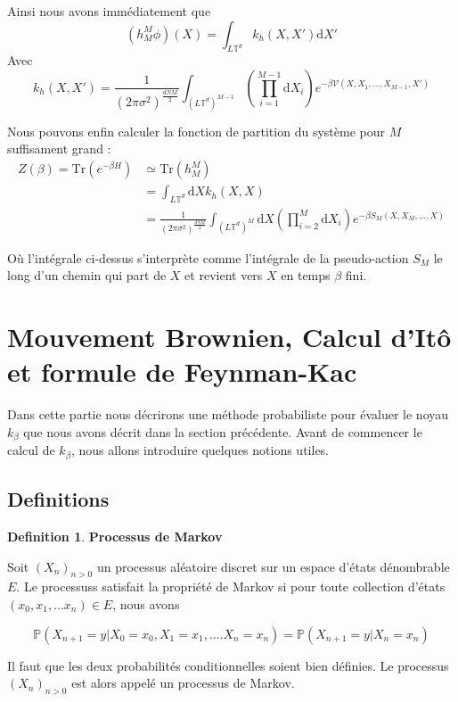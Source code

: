 \documentclass[11pt]{article}
\theoremstyle{definition}
\newtheorem{definition}{Definition}[section]
\theoremstyle{remark}
\newcommand{\dom}{L\mathbb{T}^d}
\begin{document}
Ainsi nous avons immédiatement que 
\begin{equation}
(h_M^M\phi)(X)=\int_{\dom}k_h(X,X')\mathrm{d}X'
\end{equation}
Avec 
\begin{equation}
k_h(X,X')=\frac{1}{(2\pi\sigma^2)^\frac{dNM}{2}}\int_{(\dom)^{M-1}} \left(\prod_{i=1}^{M-1}\mathrm{d}X_i\right) e^{-\beta \mathcal{V}(X,X_1,\ldots,X_{M-1},X')}
\end{equation}

Nous pouvons enfin calculer la fonction de partition du système pour $M$ suffisament grand :
\begin{align*}
Z(\beta)=\mathrm{Tr}(e^{-\beta H})& \simeq \mathrm{Tr}(h_M^M)
\\
&= \int_{\dom}\mathrm{d}X k_h(X,X)
\\
&= \frac{1}{(2\pi\sigma^2)^\frac{dNM}{2}}\int_{(\dom)^{M}} \mathrm{d}X\left(\prod_{i=2}^{M}\mathrm{d}X_i\right) e^{-\beta S_M(X,X_M,\ldots,X)}
\end{align*}

Où l'intégrale ci-dessus s'interprète comme l'intégrale de la pseudo-action $S_M$ le long d'un chemin qui part de $X$ et revient vers $X$ en temps $\beta$ fini.

\section{Mouvement Brownien, Calcul d'Itô et formule de Feynman-Kac}
Dans cette partie nous décrirons une méthode probabiliste pour évaluer le noyau $k_{\beta}$ que nous avons décrit dans la section précédente. 
Avant de commencer le calcul de $k_{\beta}$, nous allons introduire quelques notions utiles.

\subsection{Definitions}

\theoremstyle{definition}

\begin{definition}{\textbf{Processus de Markov}}

Soit $(X_n)_{n >0}$ un processus aléatoire discret sur un espace d'états dénombrable $E$. Le processuss satisfait la propriété de Markov si pour toute collection d'états $(x_0, x_1, ... x_n) \in E$, nous avons 

\begin{equation} 
\mathbb{P}(X_{n+1} = y | X_0 = x_0, X_1 = x_1,....X_n = x_n) = \mathbb{P}(X_{n+1} = y | X_n = x_n)
\end{equation}

Il faut que les deux probabilités conditionnelles soient bien définies. Le processus $(X_n)_{n>0} $ est alors appelé un processus de Markov.

\end{definition}
\end{document}
